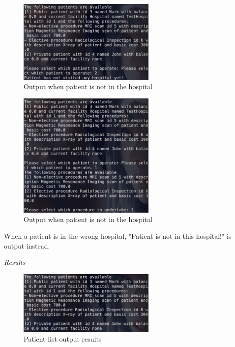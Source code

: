 \documentclass{article}
\begin{document}
	\begin{figure}
		\begin{center}
			\includegraphics[width=0.6\textwidth]{figures/Operating/Operating_hospital_02.png}
		\end{center}
		\caption{Output when patient is not in the hospital}\label{fig:operating_hospital_02}
	\end{figure}

	\begin{figure}
		\begin{center}
			\includegraphics[width=0.6\textwidth]{figures/Operating/Operating_hospital_03.png}
		\end{center}
		\caption{Output when patient is not in the hospital}\label{fig:operating_hospital_03}
	\end{figure}

	When a patient is in the wrong hospital, "Patient is not in this hospital!" is output instead.

	\textit{Results}
	\begin{figure}
		\begin{center}
			\includegraphics[width=0.6\textwidth]{figures/Operating/Operating_hospital_04.png}
		\end{center}
		\caption{Patient list output results}\label{fig:operating_hospital_04}
	\end{figure}
\end{document}
